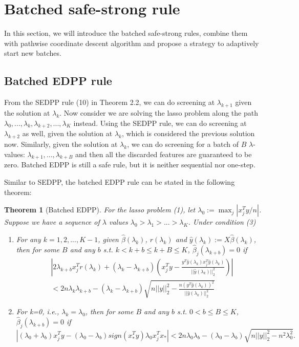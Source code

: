 \documentclass{article}
\newtheorem{theorem}{Theorem}[section]
\begin{document}
\section{Batched safe-strong rule}
\label{sec:method}

In this section, we will introduce the batched safe-strong rules, combine them with pathwise coordinate descent algorithm and propose a strategy to adaptively start new batches.

\subsection{Batched EDPP rule}

From the SEDPP rule (10) in Theorem 2.2, we can do screening at $\lambda_{k+1}$ given the solution at $\lambda_k$. Now consider we are solving the lasso problem along the path $\lambda_0,...,\lambda_k,\lambda_{k+2},...,\lambda_K$ instead. Using the SEDPP rule, we can do screening at $\lambda_{k+2}$ as well, given the solution at $\lambda_k$, which is considered the previous solution now. Similarly, given the solution at $\lambda_k$, we can do screening for a batch of $B$ $\lambda$-values: $\lambda_{k+1},...,\lambda_{k+B}$ and then all the discarded features are guaranteed to be zero. Batched EDPP is still a safe rule, but it is neither sequential nor one-step.

Similar to SEDPP, the batched EDPP rule can be stated in the following theorem:

\begin{theorem}[Batched EDPP]
    For the lasso problem (1), let $\lambda_0:=\max_j|x_j^Ty/n|$. Suppose we have a sequence of $\lambda$ values $\lambda_0>\lambda_1>...>\lambda_K$. Under condition (3)
    \begin{enumerate}
        \item For any $k=1,2,...,K-1$, given $\hat{\beta}(\lambda_k)$, $r(\lambda_k)$ and $\hat{y}(\lambda_k):=X\hat{\beta}(\lambda_k)$, then for some $B$ and any $b$ s.t. $k<k+b\leq k+B\leq K$, $\hat{\beta}_j(\lambda_{k+b})=0$ if
        \begin{equation}
            \begin{split}
                &\left|2\lambda_{k+b}x_j^Tr(\lambda_k)+(\lambda_k-\lambda_{k+b})\left( x_j^Ty-\frac{y^T\hat{y}(\lambda_k)x_j^T\hat{y}(\lambda_k)}{||\hat{y}(\lambda_k)||_2^2}\right)\right|\\&<2n\lambda_k\lambda_{k+b}-(\lambda_k-\lambda_{k+b})\sqrt{n||y||_2^2-\frac{n(y^T\hat{y}(\lambda_k))^2}{||\hat{y}(\lambda_k)||_2^2}}
            \end{split}
        \end{equation}
        \item For k=0, i.e., $\lambda_k=\lambda_0$, then for some $B$ and any $b$ s.t. $0<b\leq B\leq K$, $\hat{\beta}_j(\lambda_{k+b})=0$ if
        \begin{equation}
        |(\lambda_0+\lambda_b)x_j^Ty-(\lambda_0-\lambda_b)sign(x_*^Ty)\lambda_0x_j^Tx_*|<2n\lambda_0\lambda_b-(\lambda_0-\lambda_b)\sqrt{n||y||_2^2-n^2\lambda_0^2}.
    \end{equation}
    \end{enumerate}
\end{theorem}
\end{document}
